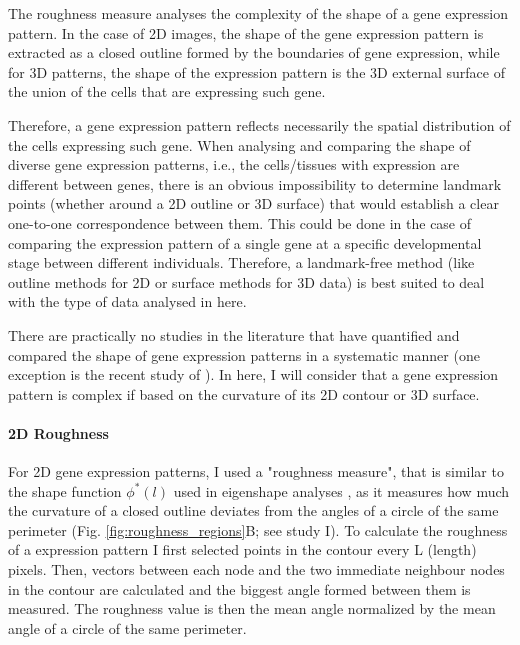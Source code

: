 The roughness measure analyses the complexity of the shape of a gene expression pattern. In the case of 2D images, the shape of the gene expression pattern is extracted as a closed outline formed by the boundaries of gene expression, while for 3D patterns, the shape of the expression pattern is the 3D external surface of the union of the cells that are expressing such gene.

Therefore, a gene expression pattern reflects necessarily the spatial distribution of the cells expressing such gene. When analysing and comparing the shape of diverse gene expression patterns, i.e., the cells/tissues with expression are different between genes, there is an obvious impossibility to determine landmark points (whether around a 2D outline or 3D surface) that would establish a clear one-to-one correspondence between them. This could be done in the case of comparing the expression pattern of a single gene at a specific developmental stage between different individuals.
Therefore, a landmark-free method (like outline methods for 2D or surface methods for 3D data) is best suited to deal with the type of data analysed in here.

There are practically no studies in the literature that have quantified and compared the shape of gene expression patterns in a systematic manner (one exception is the recent study of \citealp{Martinez-Abadias2016}). In here, I will consider that a gene expression pattern is complex if based on the curvature of its 2D contour or 3D surface.

\paragraph{2D Roughness}
For 2D gene expression patterns, I used a "roughness measure", that is similar to the shape function $\phi^{*}(l)$ used in eigenshape analyses \citep{Lohmann1983}, as it measures how much the curvature of a closed outline deviates from the angles of a circle of the same perimeter (Fig. \ref{fig:roughness_regions}B; see study I). 
To calculate the roughness of a expression pattern I first selected points in the contour every L (length) pixels. Then, vectors between each node and the two immediate neighbour nodes in the contour are calculated and the biggest angle formed between them is measured. The roughness value is then the mean angle normalized by the mean angle of a circle of the same perimeter.

